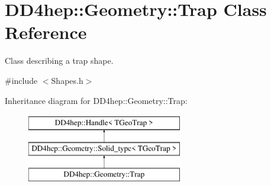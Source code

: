 \hypertarget{class_d_d4hep_1_1_geometry_1_1_trap}{}\section{D\+D4hep\+:\+:Geometry\+:\+:Trap Class Reference}
\label{class_d_d4hep_1_1_geometry_1_1_trap}


Class describing a trap shape.  




{\ttfamily \#include $<$Shapes.\+h$>$}

Inheritance diagram for D\+D4hep\+:\+:Geometry\+:\+:Trap\+:\begin{figure}[H]
\begin{center}
\leavevmode
\includegraphics[height=3.000000cm]{class_d_d4hep_1_1_geometry_1_1_trap}
\end{center}
\end{figure}
